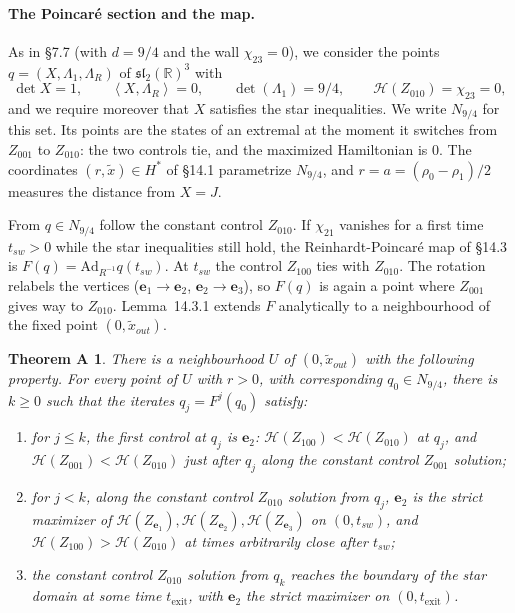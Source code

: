 \documentclass[11pt,a4paper]{article}
\theoremstyle{plain}
\newtheorem*{theoremA}{Theorem A}
\theoremstyle{definition}
\theoremstyle{remark}
\newcommand{\bracks}[2]{\left\langle #1,#2\right\rangle}
\newcommand{\Ad}{\mathrm{Ad}}
\renewcommand{\sl}{\mathfrak{sl}_2}
\newcommand{\R}{\mathbb{R}}
\renewcommand{\H}{\mathcal{H}}
\newcommand{\ep}{\mathbf{e}}
\newcommand{\sw}{_{sw}}
\newcommand{\tex}{t_{\mathrm{exit}}}
\begin{document}
\paragraph{The Poincar\'e section and the map.} As in \S7.7 (with $d=9/4$ and the wall
$\chi_{23}=0$), we consider the points $q=(X,\Lambda_1,\Lambda_R)$ of $\sl(\R)^3$ with
\[
\det X=1,\qquad\bracks X{\Lambda_R}=0,\qquad\det(\Lambda_1)=9/4,\qquad
\H(Z_{010})=\chi_{23}=0,
\]
and we require moreover that $X$ satisfies the star inequalities. We write $N_{9/4}$ for this set.
Its points are the states of an extremal at the moment it switches from $Z_{001}$ to $Z_{010}$:
the two controls tie, and the maximized Hamiltonian is $0$. The coordinates $(r,\tilde x)\in H^*$
of \S14.1 parametrize $N_{9/4}$, and $r=a=(\rho_0-\rho_1)/2$ measures the distance from $X=J$.

From $q\in N_{9/4}$ follow the constant control $Z_{010}$. If $\chi_{21}$ vanishes for a first
time $t\sw>0$ while the star inequalities still hold, the Reinhardt-Poincar\'e map of \S14.3 is
$F(q)=\Ad_{R^{-1}}q(t\sw)$. At $t\sw$ the control $Z_{100}$ ties with $Z_{010}$. The rotation
relabels the vertices ($\ep_1\to\ep_2$, $\ep_2\to\ep_3$), so $F(q)$ is again a point where
$Z_{001}$ gives way to $Z_{010}$. Lemma~14.3.1 extends $F$ analytically to a neighbourhood of the
fixed point $(0,\tilde x_{out})$.

\begin{theoremA}
There is a neighbourhood $U$ of $(0,\tilde x_{out})$ with the following property. For every
point of $U$ with $r>0$, with corresponding $q_0\in N_{9/4}$, there is $k\ge0$ such that the
iterates $q_j=F^j(q_0)$ satisfy:
\begin{enumerate}[label=\textup{(\arabic*)},itemsep=1pt]
\item for $j\le k$, the first control at $q_j$ is $\ep_2$: $\H(Z_{100})<\H(Z_{010})$ at $q_j$, and
$\H(Z_{001})<\H(Z_{010})$ just after $q_j$ along the constant control $Z_{001}$ solution;
\item for $j<k$, along the constant control $Z_{010}$ solution from $q_j$, $\ep_2$ is the strict
maximizer of $\H(Z_{\ep_1}),\H(Z_{\ep_2}),\H(Z_{\ep_3})$ on $(0,t\sw)$, and
$\H(Z_{100})>\H(Z_{010})$ at times arbitrarily close after $t\sw$;
\item the constant control $Z_{010}$ solution from $q_k$ reaches the boundary of the star domain
at some time $\tex$, with $\ep_2$ the strict maximizer on $(0,\tex)$.
\end{enumerate}
\end{theoremA}
\end{document}
